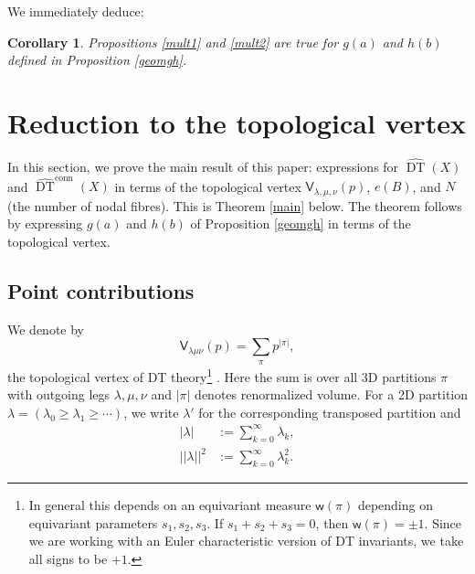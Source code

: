 \documentclass{amsart}
\newtheorem{corollary}[theorem]{Corollary}
\theoremstyle{definition}
\newcommand{\sfV}{\mathsf{V}}
\newcommand{\DT}{\operatorname{DT}}
\newcommand{\conn}{\operatorname{conn}}
\begin{document}
We immediately deduce:  
\begin{corollary} 
Propositions \ref{mult1} and \ref{mult2} are true for $g(a)$ and $h(b)$ defined in Proposition \ref{geomgh}.
\end{corollary}   
   
   
\section{Reduction to the topological vertex}  \label{vertex} 

In this section, we prove the main result of this paper: expressions for $\widehat{\DT}(X)$ and $\widehat{\DT}^{\conn}(X)$ in terms of the topological vertex $\sfV_{\lambda,\mu,\nu}(p)$, $e(B)$, and $N$ (the number of nodal fibres). This is Theorem \ref{main} below. The theorem follows by expressing $g(a)$ and $h(b)$ of Proposition \ref{geomgh} in terms of the topological vertex. 


\subsection{Point contributions}   

We denote by 
$$
\sfV_{\lambda\mu\nu}(p) = \sum_{\pi} p^{|\pi|}, 
$$
the topological vertex of DT theory\footnote{In general this depends on an equivariant measure $\mathsf{w}(\pi)$ depending on equivariant parameters $s_1, s_2, s_3$. If $s_1+s_2+s_3=0$, then $\mathsf{w}(\pi) = \pm 1$. Since we are working with an Euler characteristic version of DT invariants, we take all signs to be $+1$.} \cite{MNOP1, MNOP2}. Here the sum is over all 3D partitions $\pi$ with outgoing legs $\lambda, \mu, \nu$ and $|\pi|$ denotes renormalized volume. For a 2D partition $\lambda = (\lambda_0 \geq \lambda_1 \geq \cdots)$, we write $\lambda'$ for the corresponding transposed partition and 
\begin{align*}
|\lambda| &:= \sum_{k=0}^{\infty} \lambda_k, \\
|\!|\lambda|\!|^2 &:= \sum_{k=0}^{\infty} \lambda_{k}^{2}.
\end{align*}
\end{document}
